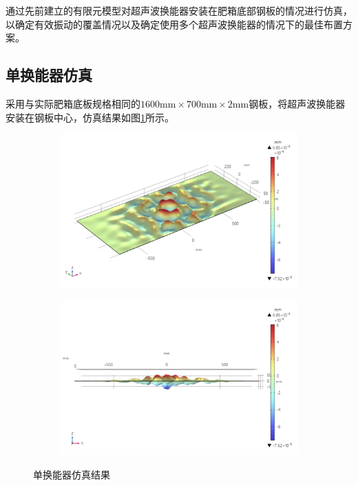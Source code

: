 \documentclass[fontset=windows,12pt,a4paper]{ctexart}
\begin{document}
通过先前建立的有限元模型对超声波换能器安装在肥箱底部钢板的情况进行仿真，以确定有效振动的覆盖情况以及确定使用多个超声波换能器的情况下的最佳布置方案。

\subsection{单换能器仿真}

采用与实际肥箱底板规格相同的$1600 \mathrm{mm} \times 700 \mathrm{mm} \times 2 \mathrm{mm}$钢板，将超声波换能器安装在钢板中心，仿真结果如图\ref{pic:单换能器仿真结果}所示。

\begin{figure}[h]
  \centering
  \begin{subfigure}{0.45\textwidth}
    \centering
    \includegraphics[width=\textwidth]{assets/result_1600x700_proper_focus.png}
  \end{subfigure}
  \hfill
  \begin{subfigure}{0.45\textwidth}
    \centering
    \includegraphics[width=\textwidth]{assets/result_1600x700_side_focus.png}
  \end{subfigure}
  \caption{单换能器仿真结果}
  \label{pic:单换能器仿真结果}
\end{figure}
\end{document}
